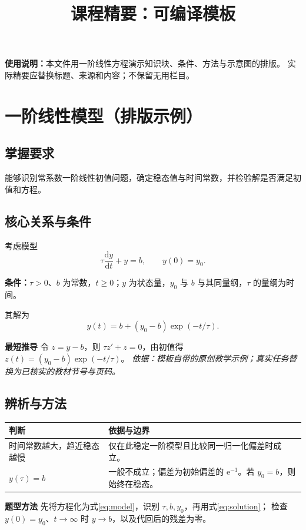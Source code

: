 \documentclass[UTF8,a4paper,11pt,fontset=fandol]{ctexart}
\title{课程精要：可编译模板}
\author{}
\date{}
\newcommand{\conditions}[1]{\par\textbf{条件：}#1\par}
\newcommand{\source}[1]{{\footnotesize\textit{依据：#1}}\par}
\newcommand{\keypoint}[1]{\par\textbf{#1}\quad}
\begin{document}
\pagestyle{plain}
\maketitle
\vspace{-2.5em}
\textbf{使用说明：}本文件用一阶线性方程演示知识块、条件、方法与示意图的排版。
实际精要应替换标题、来源和内容；不保留无用栏目。

\section{一阶线性模型（排版示例）}
\subsection*{掌握要求}
能够识别常系数一阶线性初值问题，确定稳态值与时间常数，并检验解是否满足初值和方程。

\subsection*{核心关系与条件}
考虑模型
\begin{equation}\label{eq:model}
 \tau\frac{\mathrm{d}y}{\mathrm{d}t}+y=b,
 \qquad y(0)=y_0 .
\end{equation}
\conditions{$\tau>0$、$b$ 为常数，$t\geq0$；$y$ 为状态量，$y_0$ 与 $b$ 与其同量纲，$\tau$ 的量纲为时间。}
其解为
\begin{equation}\label{eq:solution}
 y(t)=b+(y_0-b)\exp(-t/\tau).
\end{equation}
\keypoint{最短推导}
令 $z=y-b$，则 $\tau z'+z=0$，由初值得
$z(t)=(y_0-b)\exp(-t/\tau)$。
\source{模板自带的原创教学示例；真实任务替换为已核实的教材节号与页码。}

\subsection*{辨析与方法}
\begin{tabularx}{\linewidth}{@{}YY@{}}
\toprule
判断 & 依据与边界 \\
\midrule
时间常数越大，趋近稳态越慢 & 仅在此稳定一阶模型且比较同一归一化偏差时成立。\\
$y(\tau)=b$ & 一般不成立；偏差为初始偏差的 $\mathrm{e}^{-1}$。若 $y_0=b$，则始终在稳态。\\
\bottomrule
\end{tabularx}

\keypoint{题型方法}
先将方程化为式\eqref{eq:model}，识别 $\tau,b,y_0$，再用式\eqref{eq:solution}；
检查 $y(0)=y_0$、$t\to\infty$ 时 $y\to b$，以及代回后的残差为零。

\begin{center}
\end{center}
\end{document}
